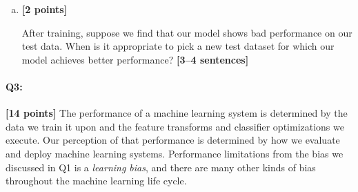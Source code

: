 \begin{enumerate}[(a)]

    \item \textbf{[2 points]}
    \begin{tcolorbox}[colback=orange!5!white,colframe=orange!75!black]
    After training, suppose we find that our model shows bad performance on our test data. 
    When is it appropriate to pick a new test dataset for which our model achieves better performance? \textbf{[3--4 sentences]}
    \end{tcolorbox}


\end{enumerate}


\pagebreak
\paragraph{Q3:} \textbf{[14 points]} The performance of a machine learning system is determined by the data we train it upon and the feature transforms and classifier optimizations we execute. Our perception of that performance is determined by how we evaluate and deploy machine learning systems. Performance limitations from the bias we discussed in Q1 is a \emph{learning bias}, and there are many other kinds of bias throughout the machine learning life cycle.

